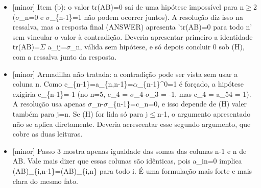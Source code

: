 \documentclass{article}%
\begin{document}
\begin{itemize}%
\item%
{[}minor{]} Item (b): o valor tr(AB)=0 sai de uma hipótese impossível para n$\geq$2 ($\sigma$\_n=0 e $\sigma$\_\{n{-}1\}=1 não podem ocorrer juntos). A resolução diz isso na ressalva, mas a resposta final (ANSWER) apresenta 'tr(AB)=0 para todo n' sem vincular o valor à contradição. Deveria apresentar primeiro a identidade tr(AB)=$\Sigma$ a\_ij=$\sigma$\_n, válida sem hipótese, e só depois concluir 0 sob (H), com a ressalva junto da resposta.%
\item%
{[}minor{]} Armadilha não tratada: a contradição pode ser vista sem usar a coluna n. Como c\_\{n{-}1\}=a\_\{n,n{-}1\}=$\alpha$\_\{n{-}1\}\^{}0=1 é forçado, a hipótese exigiria c\_\{n{-}1\}={-}1 (no n=5, c\_4 = $\sigma$\_4-$\sigma$\_3 = -1, mas c\_4 = a\_54 = 1). A resolução usa apenas $\sigma$\_n-$\sigma$\_\{n{-}1\}=c\_n=0, e isso depende de (H) valer também para j=n. Se (H) for lida só para j$\leq$n-1, o argumento apresentado não se aplica diretamente. Deveria acrescentar esse segundo argumento, que cobre as duas leituras.%
\item%
{[}minor{]} Passo 3 mostra apenas igualdade das somas das colunas n-1 e n de AB. Vale mais dizer que essas colunas são idênticas, pois a\_in=0 implica (AB)\_\{i,n{-}1\}=(AB)\_\{i,n\} para todo i. É uma formulação mais forte e mais clara do mesmo fato.%
\end{itemize}%
\end{document}
